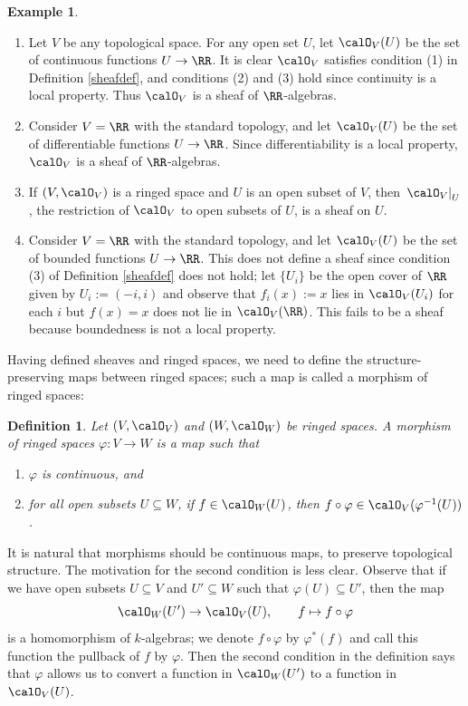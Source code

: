 \documentclass[12pt]{amsart}
\theoremstyle{plain}
\newtheorem{definition}[theorem]{Definition}
\theoremstyle{definition}
\newtheorem{example}[theorem]{Example}
\begin{document}
\begin{example}
\begin{enumerate}
\item Let $V$ be any topological space.
For any open set $U$, let $\calO_V(U)$ be the set of continuous functions $U \to \RR$.
It is clear $\calO_V$ satisfies condition (1) in Definition \ref{sheafdef}, and conditions (2) and (3) hold since continuity is a local property. Thus $\calO_V$ is a sheaf of $\RR$-algebras.
\item Consider $V = \RR$ with the standard topology, and let $\calO_V(U)$ be the set of differentiable functions $U \to \RR$.
Since differentiability is a local property, $\calO_V$ is a sheaf of $\RR$-algebras.
\item If $(V, \calO_V)$ is a ringed space and $U$ is an open subset of $V$, then $\left. \calO_V \right|_U$, the restriction of $\calO_V$ to open subsets of $U$, is a sheaf on $U$.
\item Consider $V = \RR$ with the standard topology, and let $\calO_V(U)$ be the set of bounded functions $U \to \RR$.
This does not define a sheaf since condition (3) of Definition \ref{sheafdef} does not hold;
let $\{U_i\}$ be the open cover of $\RR$ given by $U_i:=(-i, i)$ and observe that $f_i(x):=x$ lies in $\calO_V(U_i)$ for each $i$ but $f(x) = x$ does not lie in $\calO_V(\RR)$.
This fails to be a sheaf because boundedness is not a local property.
\end{enumerate}
\end{example}

Having defined sheaves and ringed spaces, we need to define the structure-preserving maps between ringed spaces;
such a map is called a morphism of ringed spaces:

\begin{definition}\label{definition:morphismringedspace}
Let $(V, \calO_V)$ and $(W, \calO_W)$ be ringed spaces.
A morphism of ringed spaces $\varphi : V \to W$ is a map such that
\begin{enumerate}
\item 
$\varphi$ is continuous, and
\item
for all open subsets $U \subseteq W$, if $f \in \calO_W(U)$, then $f\circ\varphi \in \calO_V(\varphi^{-1}(U))$.
\end{enumerate}
\end{definition}

It is natural that morphisms should be continuous maps, to preserve topological structure.
The motivation for the second condition is less clear.
Observe that if we have open subsets $U \subseteq V$ and $U' \subseteq W$ such that $\varphi(U)\subseteq U'$, then the map
$$\calO_W(U') \to \calO_V(U), \qquad f \mapsto f\circ\varphi$$
is a homomorphism of $k$-algebras;
we denote $f \circ \varphi$ by $\varphi^*(f)$ and call this function the pullback of $f$ by $\varphi$.
Then the second condition in the definition says that $\varphi$ allows us to convert a function in $\calO_W(U')$ to a function in $\calO_V(U)$.
\end{document}
